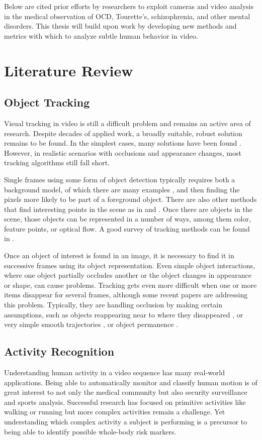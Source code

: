 \documentclass[11pt]{article}
\newcounter{list}
\begin{document}
Below are cited prior efforts by researchers to exploit cameras and video analysis in the medical observation of OCD, Tourette's, schizophrenia, and other mental disorders.  This thesis will build upon work by developing new methods and metrics with which to analyze subtle human behavior in video.

\section{Literature Review}
\subsection{Object Tracking}
Visual tracking in video is still a difficult problem and remains an active area of research. Despite decades of applied work, a broadly suitable, robust solution remains to be found. In the simplest cases, many solutions have been found \cite{comaniciu2002} \cite{bradski98}. However, in realistic scenarios with occlusions and appearance changes, most tracking algorithms still fall short.

Single frames using some form of object detection typically requires both a background model, of which there are many examples \cite{Elgammal} \cite{Stauffer}, and then finding the pixels more likely to be part of a foreground object. There are also other methods that find interesting points in the scene as in \cite{tomasi1991} and \cite{lowe2004}. Once there are objects in the scene, those objects can be represented in a number of ways, among them color, feature points, or optical flow. A good survey of tracking methods can be found in \cite{yilmaz2006}.

Once an object of interest is found in an image, it is necessary to find it in successive frames using its object representation. Even simple object interactions, where one object partially occludes another or the object changes in appearance or shape, can cause problems. Tracking gets even more difficult when one or more items disappear for several frames, although some recent papers are addressing this problem. Typically, they are handling occlusion by making certain assumptions, such as objects reappearing near to where they disappeared \cite{papadourakis2010}, or very simple smooth trajectories \cite{iraei2015}, or object permanence \cite{huang2005}.

\subsection{Activity Recognition}
Understanding human activity in a video sequence has many real-world applications. Being able to automatically monitor and classify human motion is of great interest to not only the medical community but also security surveillance and sports analysis. Successful research has focused on primitive activities like walking or running but more complex activities remain a challenge. Yet understanding which complex activity a subject is performing is a precursor to being able to identify possible whole-body risk markers.
\end{document}
